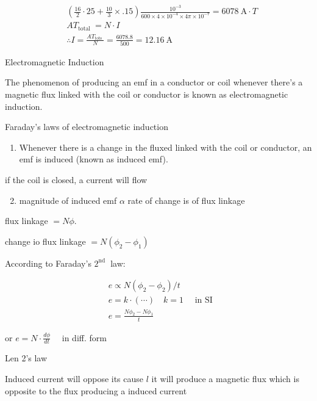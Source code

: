 \documentclass[12pt, a4paper]{article}
\begin{document}
$$
	\begin{aligned}
		 & \left(\frac{16}{2} \cdot 25+\frac{10}{3} \times .15\right) \frac{10^{-3}}{600 \times 4 \times 10^{-4} \times 4 \pi \times 10^{-7}}=6078 \mathrm{~A} \cdot T \\
		 & A T_{\text {total }}=N \cdot I                                                                                                                              \\
		 & \therefore I=\frac{A T_{\text {tots }}}{N}=\frac{6078.8}{500}=12.16 \mathrm{~A}
	\end{aligned}
$$

Electromagnetic Induction

The phenomenon of producing an emf in a conductor or coil whenever there's a magnetic flux linked with the coil or conductor is known as electromagnetic induction.

Faraday's laws of electromagnetic induction

\begin{enumerate}
	\item Whenever there is a change in the fluxed linked with the coil or conductor, an emf is induced (known as induced emf).
\end{enumerate}

if the coil is closed, a current will flow

\begin{enumerate}
	\setcounter{enumi}{1}
	\item magnitude of induced emf $\alpha$ rate of change is of flux linkage
\end{enumerate}

flux linkage $=N \phi$.

change io flux linkage $=N\left(\phi_{2}-\phi_{1}\right)$

According to Faraday's $2^{\text {nd }}$ law:

$$
	\begin{aligned}
		 & e \propto N\left(\phi_{2}-\phi_{2}\right) / t \quad \\
		 & e=k \cdot(\cdots) \quad k=1 \quad \text { in SI }   \\
		 & e=\frac{N \phi_{2}-N \phi_{1}}{t}
	\end{aligned}
$$

or $e=N \cdot \frac{d \phi}{d t} \quad$ in diff. form

Len 2's law

Induced current will oppose its cause $l$ it will produce a magnetic flux which is opposite to the flux producing a induced current
\end{document}

